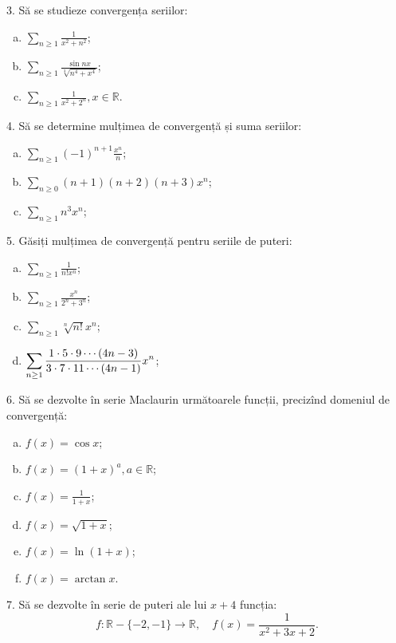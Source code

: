 \documentclass[11pt,a4paper]{article}
\newcommand\ds{\displaystyle}
\newcommand\RR{\mathbb{R}}
\theoremstyle{dotless}
\theoremstyle{dotlessdr}
\begin{document}
\vspace{1cm}

3. Să se studieze convergența seriilor:
\begin{enumerate}[(a)]
\item $\ds\sum_{n \geq 1} \frac{1}{x^2 + n^2}$;
\item $\ds\sum_{n \geq 1} \frac{\sin nx}{\sqrt[3]{n^4 + x^4}}$;
\item $\ds\sum_{n \geq 1} \frac{1}{x^2 + 2^n}, x \in \RR$.
\end{enumerate}

\vspace{1cm}

4. Să se determine mulțimea de convergență și suma seriilor:
\begin{enumerate}[(a)]
\item $\ds \sum_{n \geq 1} (-1)^{n + 1} \frac{x^n}{n}$;
\item $\ds \sum_{n \geq 0} (n + 1)(n + 2)(n + 3) x^n$;
\item $\ds \sum_{n \geq 1} n^3 x^n$;
\end{enumerate}

\vspace{1cm}

5. Găsiți mulțimea de convergență pentru seriile de puteri:
\begin{enumerate}[(a)]
\item $\ds\sum_{n \geq 1} \frac{1}{n! x^n}$;
\item $\ds\sum_{n \geq 1} \frac{x^n}{2^n + 3^n}$;
\item $\ds\sum_{n \geq 1} \sqrt[n]{n!} x^n$;
\item $\ds\sum_{n \geq 1} \frac{1 \cdot 5 \cdot 9 \cdots (4n - 3)}{ %
    3 \cdot 7 \cdot 11 \cdots (4n - 1)} x^n$;
\end{enumerate}

\vspace{1cm}

6. Să se dezvolte în serie Maclaurin următoarele funcții, precizînd domeniul
de convergență:
\begin{enumerate}[(a)]
\item $f(x) = \cos x$;
\item $f(x) = (1 + x)^a, a \in \RR$;
\item $f(x) = \frac{1}{1 + x}$;
\item $f(x) = \sqrt{1 + x}$;
\item $f(x) = \ln ( 1 + x)$;
\item $f(x) = \arctan x$.
\end{enumerate}

\vspace{1cm}

7. Să se dezvolte în serie de puteri ale lui $x + 4$ funcția:
\[
  f: \RR - \{ -2, -1 \} \to \RR, \quad %
  f(x) = \frac{1}{x^2 + 3x + 2}.
\]
\end{document}
